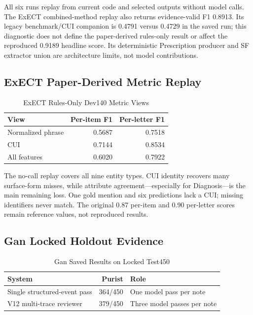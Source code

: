 \documentclass[conference]{IEEEtran}
\begin{document}
All six runs replay from current code and selected outputs without model calls.
The ExECT combined-method replay also returns evidence-valid F1 0.8913. Its legacy
benchmark/CUI companion is 0.4791 versus 0.4729 in the saved run; this diagnostic
does not define the paper-derived rules-only result or affect the reproduced
0.9189 headline score. Its deterministic Prescription producer and SF extractor
union are architecture limits, not model contributions.

\subsection{ExECT Paper-Derived Metric Replay}

\begin{table}[tbp]
\caption{ExECT Rules-Only Dev140 Metric Views}
\label{tab:exect-published}
\centering
\scriptsize
\begin{tabular}{lrr}
\toprule
View & Per-item F1 & Per-letter F1 \\
\midrule
Normalized phrase & 0.5687 & 0.7518 \\
CUI & 0.7144 & 0.8534 \\
All features & 0.6020 & 0.7922 \\
\bottomrule
\end{tabular}
\end{table}

The no-call replay covers all nine entity types. CUI identity recovers many
surface-form misses, while attribute agreement---especially for Diagnosis---is
the main remaining loss. One gold mention and six predictions lack a CUI;
missing identifiers never match. The original 0.87 per-item and 0.90 per-letter
scores remain reference values, not reproduced results.

\subsection{Gan Locked Holdout Evidence}

\begin{table}[tbp]
\caption{Gan Saved Results on Locked Test450}
\label{tab:gan-holdout}
\centering
\scriptsize
\begin{tabular}{lrl}
\toprule
System & Purist & Role \\
\midrule
Single structured-event pass & 364/450 & One model pass per note \\
V12 multi-trace reviewer & 379/450 & Three model passes per note \\
\bottomrule
\end{tabular}
\end{table}
\end{document}
